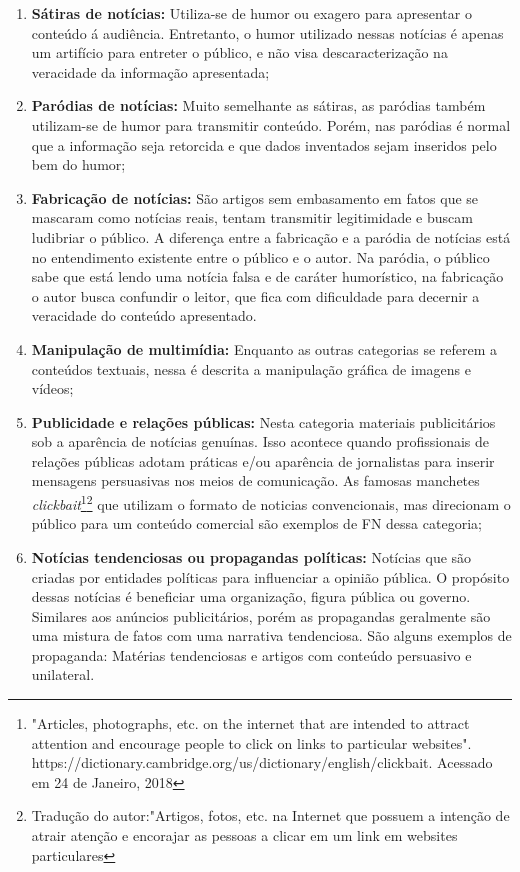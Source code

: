 \begin{enumerate}
    \item \textbf{Sátiras de notícias:} Utiliza-se de humor ou exagero para apresentar o conteúdo á audiência. Entretanto, o humor utilizado nessas notícias é apenas um artifício para entreter o público, e não visa descaracterização na veracidade da informação apresentada;
    
    \item \textbf{Paródias de notícias:} Muito semelhante as sátiras, as paródias também utilizam-se de humor para transmitir conteúdo. Porém, nas paródias é normal que a informação seja retorcida e que dados inventados sejam inseridos pelo bem do humor; 
    
    \item \textbf{Fabricação de notícias:} São artigos sem embasamento em fatos que se mascaram como notícias reais, tentam transmitir legitimidade e buscam ludibriar o público. A diferença entre a fabricação e a paródia de notícias está no entendimento existente entre o público e o autor.  Na paródia, o público sabe que está lendo uma notícia falsa e de caráter humorístico, na fabricação o autor busca confundir o leitor, que fica com dificuldade para decernir a veracidade do conteúdo apresentado.
    
    \item \textbf{Manipulação de multimídia:} Enquanto as outras categorias se referem a conteúdos textuais, nessa é descrita a manipulação gráfica de imagens e vídeos;
    
    \item \textbf{Publicidade e relações públicas:} Nesta categoria materiais publicitários sob a aparência de notícias genuínas. Isso acontece quando profissionais de relações públicas adotam práticas e/ou aparência de jornalistas para inserir mensagens persuasivas nos meios de comunicação. As famosas manchetes \emph{clickbait}\footnote{"Articles, photographs, etc. on the internet that are intended to attract attention and encourage people to click on links to particular websites". https://dictionary.cambridge.org/us/dictionary/english/clickbait. Acessado em 24 de Janeiro, 2018}\footnote{Tradução do autor:"Artigos, fotos, etc. na Internet que possuem a intenção de atrair atenção e encorajar as pessoas a clicar em um link em websites particulares} que utilizam o formato de noticias convencionais, mas direcionam o público para um conteúdo comercial são exemplos de FN dessa categoria;
    
    \item \textbf{Notícias tendenciosas ou propagandas políticas:} Notícias que são criadas por entidades políticas para influenciar a opinião pública. O propósito dessas notícias é beneficiar uma organização, figura pública ou governo. Similares aos anúncios publicitários, porém as propagandas geralmente são uma mistura de fatos com uma narrativa tendenciosa. São alguns exemplos de propaganda: Matérias tendenciosas e artigos com conteúdo persuasivo e unilateral.
\end{enumerate}

